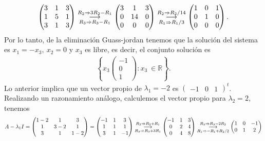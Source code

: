 \documentclass[11pt,letterpaper]{article}
\newcommand{\mR}{\mathbb{R}}
\newcommand{\grstep}[2][\relax]{%
   \ensuremath{\mathrel{
       {\mathop{\longrightarrow}\limits^{#2\mathstrut}_{
                                     \begin{subarray}{l} #1 \end{subarray}}}}}}
\begin{document}
\begin{enumerate}
\begin{align*}
\begin{pmatrix}
3 & 1 & 3\\
1 & 5 & 1\\
3 & 1 & 3
\end{pmatrix}%
\grstep[R_3 \Rightarrow R_3-R_1]{R_2 \Rightarrow 3R_2-R_1}
%
\begin{pmatrix}
3 & 1 & 3\\
0 &14 & 0\\
0 & 0 & 0
\end{pmatrix}
%
\grstep[R_1 \Rightarrow R_1/3]{R_2 \Rightarrow R_2/14}
%
\begin{pmatrix}
1 & 0 & 1\\
0 & 1 & 0\\
0 & 0 & 0
\end{pmatrix}.
\end{align*}
Por lo tanto, de la eliminación Guass-jordan tenemos que la solución del sistema es $x_1=-x_3, \ x_2=0$ y $x_3$ es libre, es decir, el conjunto solución es
\begin{align*}
\left\{x_3\begin{pmatrix}
-1\\
 0\\
 1
\end{pmatrix}: x_3 \ \in \mR \right\}.
\end{align*}
Lo anterior implica que un vector propio de $\lambda_1=-2$ es 
$\begin{pmatrix}
-1 & 0 & 1
\end{pmatrix}^t$. Realizando un razonamiento análogo, calculemos el vector propio para $\lambda_2=2$, tenemos 
\begin{align*}
A-\lambda_1I=\begin{pmatrix}
1-2 & 1 & 3\\
1 & 3-2 & 1\\
3 & 1 & 1-2 
\end{pmatrix}=\begin{pmatrix}
-1 & 1 & 3\\
1 & 1 & 1\\
3 & 1 & -1
\end{pmatrix}%
\grstep[R_3 \Rightarrow R_3+3R_1]{R_2 \Rightarrow R_2+R_1}
%
\begin{pmatrix}
-1 & 1 & 3\\
0 & 2 & 4\\
0 & 4 & 8
\end{pmatrix}
%
\grstep[R_1 \Rightarrow -R_1+R_2/2]{R_3 \Rightarrow R_3-2R_2}
%
\begin{pmatrix}
1 & 0 & -1\\
0 & 1 & 2\\

\end{pmatrix}
\end{align*}
\end{enumerate}
\end{document}

